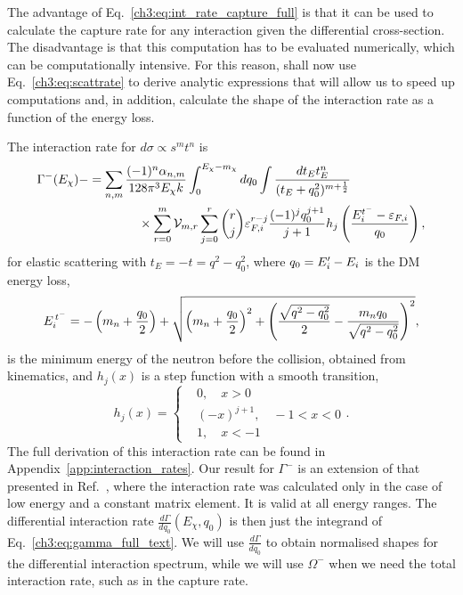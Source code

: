The advantage of Eq.~\ref{ch3:eq:int_rate_capture_full} is that it can be used to calculate the capture rate for any interaction given the differential cross-section. The disadvantage is that this computation has to be evaluated numerically, which can be computationally intensive. For this reason, shall now use Eq.~\ref{ch3:eq:scattrate} to derive analytic expressions that will allow us to speed up computations and, in addition, calculate the shape of the interaction rate as a function of the energy loss. 

The interaction rate for $d\sigma \propto s^m t^n$ is 
\begin{align}
    \begin{split}
        \Gamma^{-}(E_\chi)- & = \sum_{n,m}  \frac{(-1)^n \alpha_{n,m}}{128\pi^3 E_\chi k }\int_0^{E_\chi -m_\chi} dq_0\int \frac{dt_E t_E^n}{(t_E + q_0^2)^{m+\frac{1}{2}}}\\
        &\hspace{4em}\times\sum_{r=0}^m \mathcal{V}_{m,r}\sum_{j = 0}^r\binom{r}{j} \varepsilon_{F,i}^{r-j}  \frac{(-1)^{j} q_0^{j+1}}{j+1} h_j\left( \frac{E_i^{t^-} - \varepsilon_{F,i}}{q_0}\right),
    \end{split}
    \label{ch3:eq:gamma_full_text}
\end{align}
for elastic scattering with $t_E=-t=q^2-q_0^2$, where $q_0=E_i'-E_i$ is the DM energy loss, 
\begin{equation}
E_i^{\, t^{-}} = -\left(m_n+\frac{q_0}{2}\right) + \sqrt{\left(m_n+\frac{q_0}{2}\right)^2+\left(\frac{\sqrt{q^2-q_0^2}}{2}-\frac{m_n q_0}{\sqrt{q^2-q_0^2}}\right)^2}, 
\end{equation}
is the minimum energy of the neutron before the collision, obtained from kinematics,  and $h_j(x)$ is a step function with a smooth transition, 
\begin{equation}
    h_j(x) = \begin{cases}
        & 0, \quad x >0\\
        & (-x)^{j+1},\quad -1<x <0\\
        & 1,\quad x<-1
    \end{cases}.
\end{equation}
The full derivation of this interaction rate can be found in Appendix~\ref{app:interaction_rates}. 
Our result for $\Gamma^-$ is an extension of that presented in Ref.~\cite{Bertoni:2013bsa_dec_DarkMatterThermalization}, where the interaction rate was calculated only in the case of low energy and a constant matrix element. It is valid at all energy ranges.
The differential interaction rate $\frac{d\Gamma}{d q_0}(E_\chi,q_0)$ is then just the integrand of Eq.~\ref{ch3:eq:gamma_full_text}.
We will use $\frac{d\Gamma}{d q_0}$ to obtain normalised shapes for the differential interaction spectrum, while we will use $\Omega^-$ when we need the total interaction rate, such as in the capture rate. 



